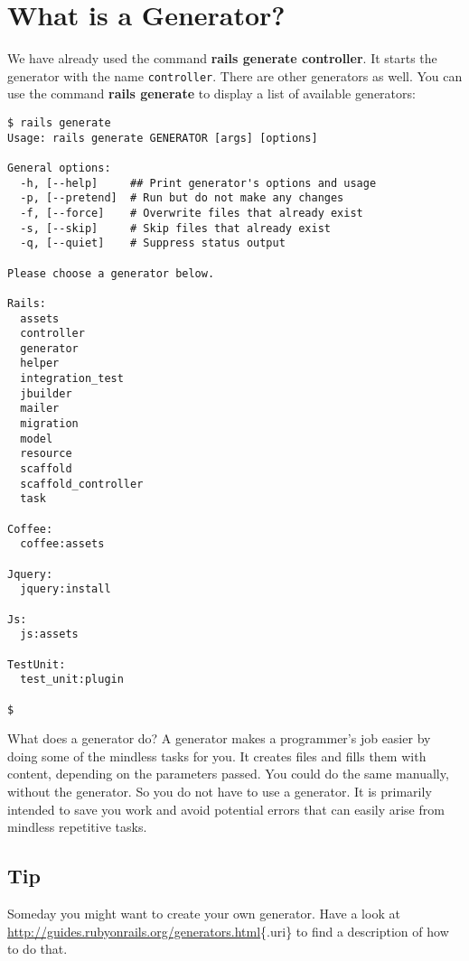 \documentclass[a4paper]{book}
\begin{document}
\section{What is a Generator?}\label{what-is-a-generator}

We have already used the command \textbf{rails generate controller}. It starts the generator with the name \texttt{controller}. There are other generators as well. You can use the command \textbf{rails generate} to display a list of available generators:

\begin{shaded}\begin{verbatim}
$ rails generate
Usage: rails generate GENERATOR [args] [options]

General options:
  -h, [--help]     ## Print generator's options and usage
  -p, [--pretend]  # Run but do not make any changes
  -f, [--force]    # Overwrite files that already exist
  -s, [--skip]     # Skip files that already exist
  -q, [--quiet]    # Suppress status output

Please choose a generator below.

Rails:
  assets
  controller
  generator
  helper
  integration_test
  jbuilder
  mailer
  migration
  model
  resource
  scaffold
  scaffold_controller
  task

Coffee:
  coffee:assets

Jquery:
  jquery:install

Js:
  js:assets

TestUnit:
  test_unit:plugin

$
\end{verbatim}\end{shaded}

What does a generator do? A generator makes a programmer's job easier by doing some of the mindless tasks for you. It creates files and fills them with content, depending on the parameters passed. You could do the same manually, without the generator. So you do not have to use a generator. It is primarily intended to save you work and avoid potential errors that can easily arise from mindless repetitive tasks.

\subsection{Tip}\label{tip-5}

Someday you might want to create your own generator. Have a look at \url{http://guides.rubyonrails.org/generators.html}\{.uri\} to find a description of how to do that.
\end{document}
